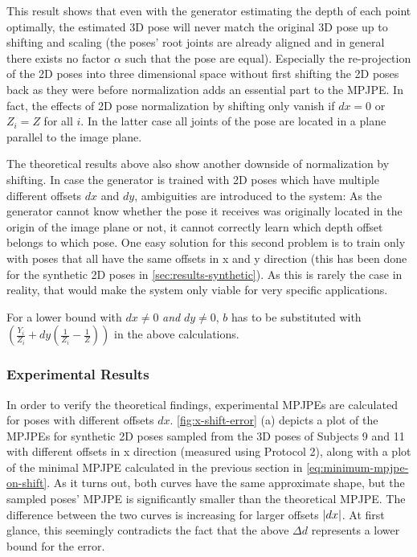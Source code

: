 This result shows that even with the generator estimating the depth of each point optimally, the estimated 3D pose will never match the original 3D pose up to shifting and scaling (the poses' root joints are already aligned and in general there exists no factor $\alpha$ such that the pose are equal).
Especially the re-projection of the 2D poses into three dimensional space without first shifting the 2D poses back as they were before normalization adds an essential part to the MPJPE.
In fact, the effects of 2D pose normalization by shifting only vanish if $dx = 0$ or $Z_i = Z$ for all $i$. 
In the latter case all joints of the pose are located in a plane parallel to the image plane.

The theoretical results above also show another downside of normalization by shifting.
In case the generator is trained with 2D poses which have multiple different offsets $dx$ and $dy$, ambiguities are introduced to the system:
As the generator cannot know whether the pose it receives was originally located in the origin of the image plane or not, it cannot correctly learn which depth offset belongs to which pose.
One easy solution for this second problem is to train only with poses that all have the same offsets in x and y direction (this has been done for the synthetic 2D poses in \autoref{sec:results-synthetic}).
As this is rarely the case in reality, that would make the system only viable for very specific applications.

For a lower bound with $dx \neq 0$ \emph{and} $dy \neq 0$, $b$ has to be substituted with $\left( \frac{Y_i}{Z_i} + dy \left( \frac{1}{Z_i} - \frac{1}{Z} \right) \right )$ in the above calculations.

\subsubsection{Experimental Results}

In order to verify the theoretical findings, experimental MPJPEs are calculated for poses with different offsets $dx$.
\autoref{fig:x-shift-error} (a) depicts a plot of the MPJPEs for synthetic 2D poses sampled from the 3D poses of Subjects 9 and 11 with different offsets in x direction (measured using Protocol 2), along with a plot of the minimal MPJPE calculated in the previous section in \autoref{eq:minimum-mpjpe-on-shift}.
As it turns out, both curves have the same approximate shape, but the sampled poses' MPJPE is significantly smaller than the theoretical MPJPE.
The difference between the two curves is increasing for larger offsets $\abs{dx}$.
At first glance, this seemingly contradicts the fact that the above $\Delta d$ represents a lower bound for the error.

